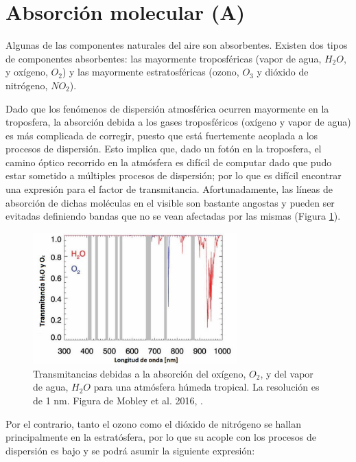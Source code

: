 \section{Absorción molecular (A)}
\label{int:s:tAbs}

    Algunas de las componentes naturales del aire son absorbentes. Existen dos tipos de componentes absorbentes: las mayormente troposféricas (vapor de agua, $H_{2}O$, y oxígeno, $O_{2}$) y las mayormente estratosféricas (ozono, $O_{3}$ y dióxido de nitrógeno, $NO_{2}$).
    
    Dado que los fenómenos de dispersión atmosférica ocurren mayormente en la troposfera, la absorción debida a los gases troposféricos (oxígeno y vapor de agua) es más complicada de corregir, puesto que está fuertemente acoplada a los procesos de dispersión. Esto implica que, dado un fotón en la troposfera, el camino óptico recorrido en la atmósfera es difícil de computar dado que pudo estar sometido a múltiples procesos de dispersión; por lo que es difícil encontrar una expresión para el factor de transmitancia. Afortunadamente, las líneas de absorción de dichas moléculas en el visible son bastante angostas y pueden ser evitadas definiendo bandas que no se vean afectadas por las mismas (Figura \ref{int:oxigeno_h20_Mobley}).

    \begin{figure}
    \centering
    \includegraphics[width=0.7\textwidth]{int/figures/oxigeno_h20_Mobley.png}
    \caption[Transmitancias debidas a la absorción del oxígeno y del vapor de agua.]{Transmitancias debidas a la absorción del oxígeno, $O_{2}$, y del vapor de agua, $H_{2}O$ para una atmósfera húmeda tropical. La resolución es de 1 nm. Figura de Mobley et al. 2016, \cite{mobley2016}.}
    \label{int:oxigeno_h20_Mobley}
    \end{figure}

    Por el contrario, tanto el ozono como el dióxido de nitrógeno se hallan principalmente en la estratósfera, por lo que su acople con los procesos de dispersión es bajo y se podrá asumir la siguiente expresión:

